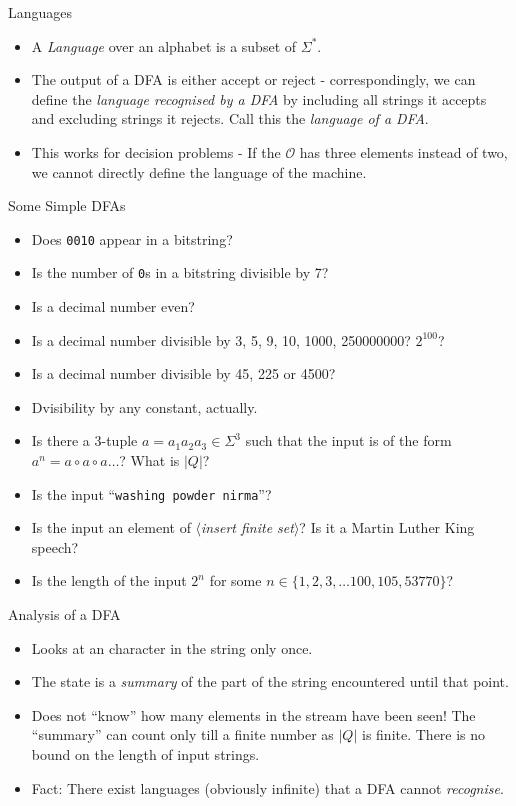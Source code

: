 \documentclass{beamer}
\begin{document}
\begin{frame}{Languages}
\begin{itemize}
    \item A \emph{Language} over an alphabet is a subset of \(\Sigma^*\).
    \item The output of a DFA is either accept or reject - correspondingly, we can define the \emph{language recognised by a DFA} by including all strings it accepts and excluding strings it rejects. Call this the \emph{language of a DFA}.
    \item This works for decision problems - If the \( \mathcal{O} \) has three elements instead of two, we cannot directly define the language of the machine.
\end{itemize}
\end{frame}
\begin{frame}{Some Simple DFAs}
    \begin{itemize}
        \item Does \texttt{0010} appear in a bitstring?
        \item Is the number of \texttt{0}s in a bitstring divisible by 7?
        \item Is a decimal number even?
        \item Is a decimal number divisible by 3, 5, 9, 10, 1000, 250000000? \(2^{100}\)?
        \item Is a decimal number divisible by 45, 225 or  4500?
        \item Dvisibility by any constant, actually.
        \item Is there a 3-tuple \(a = a_1a_2a_3 \in \Sigma^3\) such that the input is of the form \(a^n = a\circ a \circ a \dots\)? What is \(|Q |\)?
        \item Is the input ``\texttt{washing powder nirma}''?
        \item Is the input an element of $\langle$\emph{insert finite set}$\rangle$? Is it a Martin Luther King speech?
        \item Is the length of the input \(2^n\) for some \( n \in \{1, 2, 3, \dots 100, 105, 53770\}\)?
    \end{itemize}
\end{frame}
\begin{frame}{Analysis of a DFA}
\begin{itemize}
    \item Looks at an character in the string only once.
    \item The state is a \emph{summary} of the part of the string encountered until that point.
    \item Does not ``know'' how many elements in the stream have been seen! The ``summary'' can count only till a finite number as \( |Q| \) is finite. There is no bound on the length of input strings.\pause
    \item Fact: There exist languages (obviously infinite) that a DFA cannot \emph{recognise}.\pause
\end{itemize}    
\end{frame}
\end{document}

